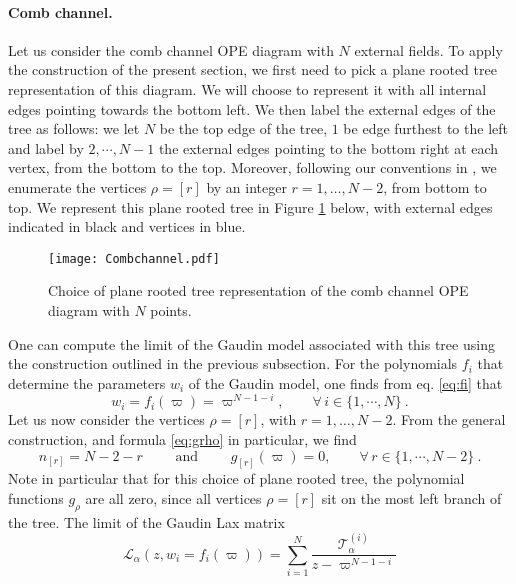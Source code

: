 \documentclass{article}
\def\Lc{\mathcal{L}}
\begin{document}
\paragraph{Comb channel.} Let us consider the comb channel OPE diagram with $N$ external fields. 
To apply the construction of the present section, we first need to pick a plane rooted tree 
representation of this diagram. We will choose to represent it with all internal edges 
pointing towards the bottom left. We then label the external edges of the tree as follows: we 
let $N$ be the top edge of the tree, $1$ be edge furthest to the left and label by $2,
\cdots,N-1$ the external edges pointing to the bottom right at each vertex, from the bottom 
to the top. Moreover, following our conventions in \cite{Buric:2020dyz}, we enumerate the vertices $\rho = [r]$ by an integer $r=1, \dots, N-2$, from bottom to top. We represent this plane rooted tree in Figure \ref{fig:comb} below, with external edges indicated 
in black and vertices in blue.
\begin{figure}[H]
\begin{center}
\texttt{[image: Combchannel.pdf]}
\caption{Choice of plane rooted tree representation of the comb channel OPE diagram 
with $N$ points.}\label{fig:comb}
\end{center}
\end{figure}
One can compute the limit of the Gaudin model associated with this tree using the construction outlined in the previous subsection. For the polynomials $f_i$ that determine the parameters 
$w_i$ of the Gaudin model, one finds from eq. \eqref{eq:fi} that 
\begin{equation}
w_i = f_i(\varpi) = \varpi^{N-1-i}, \qquad \forall\,i\in\lbrace 1,\cdots,N \rbrace\ .
\end{equation}
Let us now consider the vertices $\rho = [r]$, with $r=1, \dots, N-2$. From the general construction, and formula
\eqref{eq:grho} in particular, we find
\begin{equation}
n_{[r]} = N-2-r \qquad \text{ and } \qquad g_{[r]}(\varpi) = 0, \qquad 
\forall\, r\in\lbrace 1,\cdots,N-2 \rbrace\ .
\end{equation}
Note in particular that for this choice of plane rooted tree, the polynomial functions 
$g_{\rho}$ are all zero, since all vertices $\rho = [r]$ sit on the most left branch 
of the tree. The limit of the Gaudin Lax matrix
\begin{equation}
\Lc_\alpha(z,w_i=f_i(\varpi)) = \sum_{i=1}^N \frac{\mathcal{T}^{(i)}_\alpha}{z-\varpi^{N-1-i}}
\end{equation}
\end{document}
